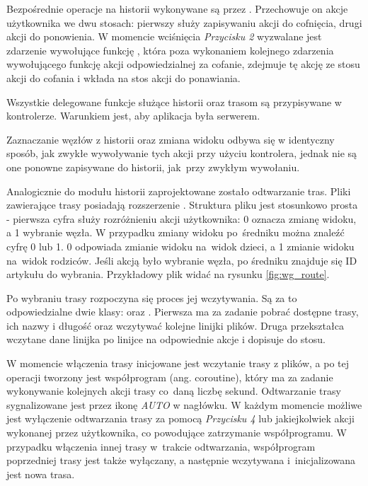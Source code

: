 Bezpośrednie operacje na historii wykonywane są przez . Przechowuje on akcje użytkownika we dwu stosach: pierwszy służy zapisywaniu akcji do cofnięcia, drugi akcji do ponowienia. W momencie wciśnięcia \textit{Przycisku 2} wyzwalane jest zdarzenie wywołujące funkcję , która poza wykonaniem kolejnego zdarzenia wywołującego funkcję akcji odpowiedzialnej za cofanie, zdejmuje tę akcję ze stosu akcji do cofania i wkłada na stos akcji do ponawiania.

Wszystkie delegowane funkcje służące historii oraz trasom są przypisywane w kontrolerze\linebreak {}. Warunkiem jest, aby aplikacja była serwerem.

Zaznaczanie węzłów z historii oraz zmiana widoku odbywa się w identyczny sposób, jak zwykłe wywoływanie tych akcji przy użyciu kontrolera, jednak nie są one ponowne zapisywane do historii, jak~przy zwykłym wywołaniu.

Analogicznie do modułu historii zaprojektowane zostało odtwarzanie tras. Pliki zawierające trasy posiadają rozszerzenie . Struktura pliku jest stosunkowo prosta - pierwsza cyfra służy rozróżnieniu akcji użytkownika: 0 oznacza zmianę widoku, a 1 wybranie węzła. W przypadku zmiany widoku po~średniku można znaleźć cyfrę 0 lub 1. 0 odpowiada zmianie widoku na~widok dzieci, a 1 zmianie widoku na~widok rodziców. Jeśli akcją było wybranie węzła, po średniku znajduje się ID artykułu do wybrania. Przykładowy plik widać na rysunku \ref{fig:wg_route}.


Po wybraniu trasy rozpoczyna się proces jej wczytywania. Są za to odpowiedzialne dwie klasy:  oraz . Pierwsza ma za zadanie pobrać dostępne trasy, ich nazwy i długość oraz wczytywać kolejne linijki plików. Druga przekształca wczytane dane linijka po linijce na odpowiednie akcje i dopisuje do stosu.

W momencie włączenia trasy inicjowane jest wczytanie trasy z plików, a po tej operacji tworzony jest współprogram (ang. coroutine), który ma za zadanie wykonywanie kolejnych akcji trasy co~daną liczbę sekund. Odtwarzanie trasy sygnalizowane jest przez ikonę \textit{AUTO} w nagłówku. W każdym momencie możliwe jest wyłączenie odtwarzania trasy za pomocą \textit{Przycisku 4} lub jakiejkolwiek akcji wykonanej przez użytkownika, co powodujące zatrzymanie współprogramu. W przypadku włączenia innej trasy w~trakcie odtwarzania, współprogram poprzedniej trasy jest także wyłączany, a następnie wczytywana i~inicjalizowana jest nowa trasa. 

